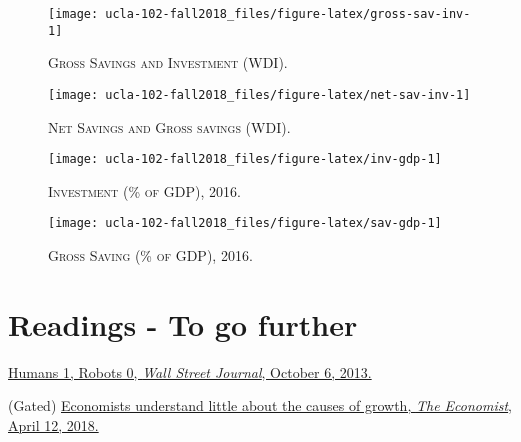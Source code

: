 \documentclass[]{book}
\theoremstyle{definition}
\theoremstyle{definition}
\theoremstyle{definition}
\theoremstyle{remark}
\begin{document}
\begin{figure}

{\centering \texttt{[image: ucla-102-fall2018\_files/figure-latex/gross-sav-inv-1]} 

}

\caption{\textsc{Gross Savings and Investment (WDI)}.}\label{fig:gross-sav-inv}
\end{figure}



\begin{figure}

{\centering \texttt{[image: ucla-102-fall2018\_files/figure-latex/net-sav-inv-1]} 

}

\caption{\textsc{Net Savings and Gross savings (WDI)}.}\label{fig:net-sav-inv}
\end{figure}



\begin{figure}

{\centering \texttt{[image: ucla-102-fall2018\_files/figure-latex/inv-gdp-1]} 

}

\caption{\textsc{Investment (\% of GDP), 2016}.}\label{fig:inv-gdp}
\end{figure}



\begin{figure}

{\centering \texttt{[image: ucla-102-fall2018\_files/figure-latex/sav-gdp-1]} 

}

\caption{\textsc{Gross Saving (\% of GDP), 2016}.}\label{fig:sav-gdp}
\end{figure}

\section*{Readings - To go further}\label{readings---to-go-further-1}

\href{https://www.wsj.com/articles/humans-1-robots-0-1381098947?tesla=y}{Humans
1, Robots 0, \emph{Wall Street Journal}, October 6, 2013.}

(Gated)
\href{https://www.economist.com/finance-and-economics/2018/04/12/economists-understand-little-about-the-causes-of-growth}{Economists
understand little about the causes of growth, \emph{The Economist},
April 12, 2018.}
\end{document}
